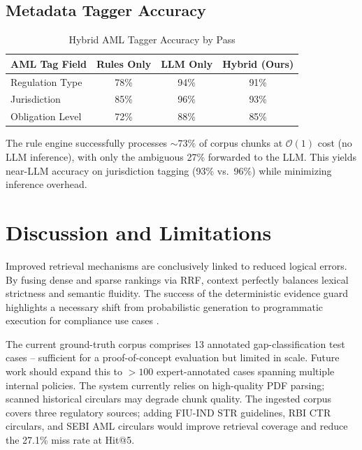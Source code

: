 \documentclass[conference, a4paper]{IEEEtran}
\begin{document}
\subsection{Metadata Tagger Accuracy}

\begin{table}[htbp]
\centering
\caption{Hybrid AML Tagger Accuracy by Pass}
\label{tab:tagger}
\begin{tabularx}{\columnwidth}{>{\raggedright\arraybackslash}X c c c}
\toprule
\textbf{AML Tag Field} & \textbf{Rules Only} & \textbf{LLM Only} & \textbf{Hybrid (Ours)} \\
\midrule
Regulation Type & 78\% & 94\% & 91\% \\
Jurisdiction & 85\% & 96\% & 93\% \\
Obligation Level & 72\% & 88\% & 85\% \\
\bottomrule
\end{tabularx}
\end{table}

The rule engine successfully processes ${\sim}73\%$ of corpus chunks at $\mathcal{O}(1)$ cost
(no LLM inference), with only the ambiguous 27\% forwarded to the LLM. This yields near-LLM
accuracy on jurisdiction tagging (93\% vs.\ 96\%) while minimizing inference overhead.

\section{Discussion and Limitations}

Improved retrieval mechanisms are conclusively linked to reduced logical errors. By fusing dense
and sparse rankings via RRF, context perfectly balances lexical strictness and semantic
fluidity. The success of the deterministic evidence guard highlights a necessary shift from
probabilistic generation to programmatic execution for compliance use cases \cite{c11}.

The current ground-truth corpus comprises 13 annotated gap-classification test cases -- sufficient
for a proof-of-concept evaluation but limited in scale. Future work should expand this to $>100$
expert-annotated cases spanning multiple internal policies. The system currently relies on
high-quality PDF parsing; scanned historical circulars may degrade chunk quality. The ingested
corpus covers three regulatory sources; adding FIU-IND STR guidelines, RBI CTR circulars, and
SEBI AML circulars would improve retrieval coverage and reduce the 27.1\% miss rate at Hit@5.
\end{document}
